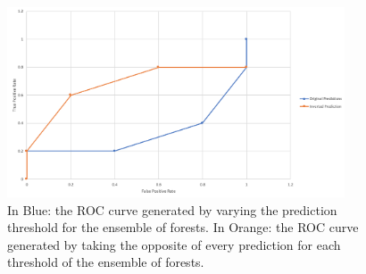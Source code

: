 \begin{figure}[h]
\centering
\includegraphics[width=10cm]{body/methodology/Both_ROC.png}
\caption{In Blue: the ROC curve generated by varying the prediction threshold for the ensemble of forests. In Orange: the ROC curve generated by taking the opposite of every prediction for each threshold of the ensemble of forests.}
\end{figure}

